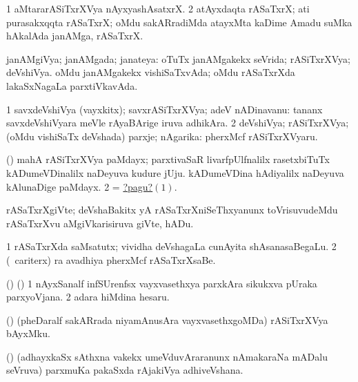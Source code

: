 \noindent
\gl{\pagu}
\bmng
\bnum
\num{1}  aMtararASiTxrXVya nAyxyashAsatxrX. 
\num{2}  atAyxdaqta rASaTxrX; ati purasakxqqta rASaTxrX; oMdu sakARradiMda atayxMta kaDime Amadu suMka hAkalAda janAMga, rASaTxrX. 
\enum
\emng
\eentry

\bentry
{}
\gl{\gu}
\bmng
janAMgiVya; janAMgada; janateya: 
\banum
{} oTuTx janAMgakekx seVrida; rASiTxrXVya; deVshiVya. 
 oMdu janAMgakekx vishiSaTxvAda; oMdu rASaTxrXda lakaSxNagaLa parxtiVkavAda. 
\eanum
\emng
\eentry

\bentry
{}
\gl{\nA}
\bmng
\bnum
\num{1} savxdeVshiVya (vayxkitx); savxrASiTxrXVya; adeV nADinavanu:  tananx savxdeVshiVyara meVle rAyaBArige iruva adhikAra. 
\num{2} deVshiVya; rASiTxrXVya; (oMdu vishiSaTx deVshada) parxje; nAgarika:  pherxMcf rASiTxrXVyaru. 
\enum
\emng

\noindent
\gl{\pagu}
\bmng
\hypertarget{national2pagu1}{} 
\bnum
{}  (\birx) 
\banum
{} mahA rASiTxrXVya paMdayx; parxtivaSaR livarfpUlfnalilx rasetxbiTuTx kADumeVDinalilx naDeyuva kudure jUju. 
 kADumeVDina hAdiyalilx naDeyuva kAlunaDige paMdayx. 
\eanum
\numie
\num{2}  = \hyperlink{national2pagu1}{?pagu?\((1)\)}. 
\enum
\emng
\eentry

\bentry
{}
\gl{\nA}
\bmng
rASaTxrXgiVte; deVshaBakitx yA rASaTxrXniSeThxyanunx toVrisuvudeMdu rASaTxrXvu aMgiVkarisiruva giVte, hADu. 
\emng
\eentry

\bentry
{}
\gl{\nA}
\bmng
\bnum
\num{1} rASaTxrXda saMsatutx; vividha deVshagaLa cunAyita shAsanasaBegaLu. 
\num{2} (\kanmu\ cariterx) ra avadhiya pherxMcf rASaTxrXsaBe. 
\enum
\emng
\eentry

\bentry
{}
\gl{\nA}
\bmng
(\ca) (\birx) 
\bnum
\num{1} nAyxSanalf infSUrenfsx vayxvasethxya parxkAra sikukxva pUraka parxyoVjana. 
\num{2} adara hiMdina hesaru. 
\enum
\emng
\eentry

\bentry
{}
\gl{\nA}
\bmng
(\ame) (pheDaralf sakARrada niyamAnusAra vayxvasethxgoMDa) rASiTxrXVya bAyxMku. 
\emng
\eentry

\bentry
{}
\gl{\nA}
\bmng
(\ame) (adhayxkaSx sAthxna \mo vakekx umeVduvAraranunx nAmakaraNa mADalu seVruva) parxmuKa pakaSxda rAjakiVya adhiveVshana. 
\emng
\eentry

